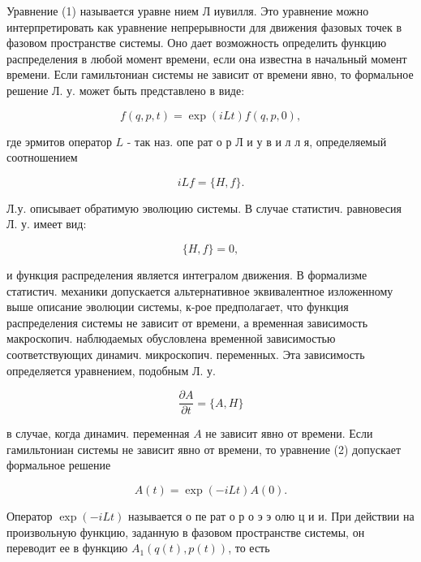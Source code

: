 \documentclass[10pt]{article}
\begin{document}
Уравнение (1) называется уравне нием Л иувилля. Это уравнение можно интерпретировать как уравнение непрерывности для движения фазовых точек в фазовом пространстве системы. Оно дает возможность определить функцию распределения в любой момент времени, если она известна в начальный момент времени. Если гамильтониан системы не зависит от времени явно, то формальное решение Л. у. может быть представлено в виде:



\[

f(q, p, t)=\exp (i L t) f(q, p, 0),

\]



где эрмитов оператор $L$ - так наз. опе рат о р Л и у в и л л я, определяемый соотношением



\[

i L f=\{H, f\} .

\]



Л.у. описывает обратимую эволюцию системы. В случае статистич. равновесия Л. у. имеет вид:



\[

\{H, f\}=0,

\]



и функция распределения является интегралом движения. В формализме статистич. механики допускается альтернативное эквивалентное изложенному выше описание эволюции системы, к-рое предполагает, что функция распределения системы не зависит от времени, а временная зависимость макроскопич. наблюдаемых обусловлена временной зависимостью соответствующих динамич. микроскопич. переменных. Эта зависимость определяется уравнением, подобным Л. у.



\[

\frac{\partial A}{\partial t}=\{A, H\}

\]



в случае, когда динамич. переменная $A$ не зависит явно от времени. Если гамильтониан системы не зависит явно от времени, то уравнение (2) допускает формальное решение



\[

A(t)=\exp (-i L t) A(0) .

\]



Оператор $\exp (-i L t)$ называется о пе рат о р о э э олю ц и и. При действии на произвольную функцию, заданную в фазовом пространстве системы, он переводит ее в функцию $A_{1}(q(t), p(t))$, то есть
\end{document}
